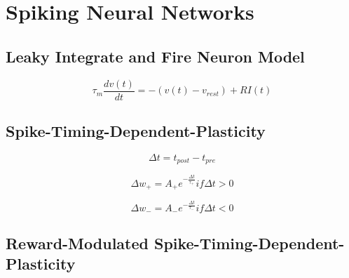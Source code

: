 \chapter{Spiking Neural Networks}
\label{section:snn}

\section{Leaky Integrate and Fire Neuron Model}





\begin{equation}
	\tau_m \frac{dv \left( t \right)}{dt} = - \left( v \left( t \right) - v_{rest} \right) + RI \left( t \right)
\end{equation}

\section{Spike-Timing-Dependent-Plasticity}

\begin{equation}
	\Delta t = t_{post} - t_{pre}
\end{equation}

\begin{equation}
	\Delta w_+ = A_+ e^{- \frac{\Delta t}{\tau_+}} if \Delta t > 0
\end{equation}

\begin{equation}
	\Delta w_- = A_- e^{- \frac{\Delta t}{\tau_-}} if \Delta t < 0
\end{equation}

\section{Reward-Modulated Spike-Timing-Dependent-Plasticity}
